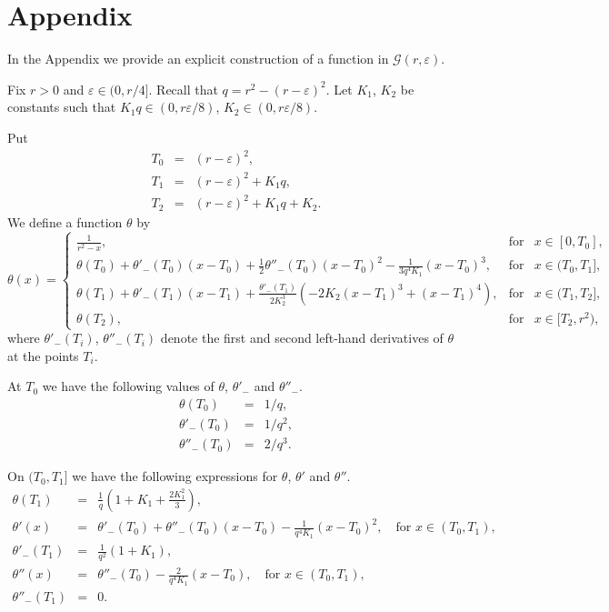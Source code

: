 \documentclass[a4paper,12pt,reqno]{amsart}
\theoremstyle{definition}
\theoremstyle{remark}
\newcommand{\eps}{\varepsilon}
\newcommand{\calG}{\mathcal{G}}
\begin{document}
 
\section{Appendix}
In the Appendix we provide an explicit construction of a function in $\calG(r,\eps)$.

Fix $r > 0$ and $\eps \in (0,r/4]$. Recall that $q = r^2 - (r- \eps)^2$. Let $K_1$, $K_2$ be constants such that $K_1 q \in (0,r\eps/8)$, 
$K_2 \in (0,r\eps/8)$.

Put 
\begin{eqnarray*}
T_0 &=& (r - \eps)^2,\\
T_1 &=& (r - \eps)^2 + K_1q,\\
T_2 &=& (r - \eps)^2 + K_1q + K_2.
\end{eqnarray*}
We define a function $\theta$ by
\begin{equation}
\label{construction_1}
\theta(x)= \left\{              
\begin{array}{lll}                   
\frac{1}{r^2 - x},&\text{for}& x \in [0,T_0], \\ 
\theta(T_0) + \theta'_{-}(T_0) (x-T_0) + \frac{1}{2}\theta''_{-}(T_0) (x-T_0)^2 - \frac{1}{3q^4 K_1} (x - T_0)^3,&\text{for}& x \in (T_0,T_1], \\ 
\theta(T_1) + \theta'_{-}(T_1) (x-T_1) + \frac{\theta'_{-}(T_1)}{2K_2^3}\left(-2K_2(x-T_1)^3+(x-T_1)^4\right),&\text{for}& x \in (T_1,T_2], \\ 
\theta(T_2),&\text{for}& x \in [T_2,r^2),
\end{array}       
\right. 
\end{equation}
where $\theta'_{-}(T_i)$, $\theta''_{-}(T_i)$ denote the first and second left-hand derivatives of $\theta$ at the points $T_i$. 

At $T_0$ we have the following values of $\theta$, $\theta'_{-}$ and $\theta''_{-}$.
\begin{eqnarray*}
\theta(T_0) &=& 1/q,\\
\theta'_{-}(T_0) &=& 1/q^2,\\
\theta''_{-}(T_0) &=& 2/q^3.
\end{eqnarray*}

On $(T_0,T_1]$ we have the following expressions for $\theta$, $\theta'$ and $\theta''$.
\begin{eqnarray*}
\theta(T_1) &=& \frac{1}{q} \left(1+K_1+\frac{2 K_1^2}{3}\right),\\
\theta'(x) &=& \theta'_{-}(T_0) + \theta''_{-}(T_0) (x-T_0) - \frac{1}{q^4 K_1} (x - T_0)^2,\quad \text{for $x \in (T_0,T_1)$,}\\
\theta'_{-}(T_1) &=& \frac{1}{q^2} \left(1+K_1\right),\\
\theta''(x) &=& \theta''_{-}(T_0) - \frac{2}{q^4 K_1} (x - T_0),\quad \text{for $x \in (T_0,T_1)$,}\\
\theta''_{-}(T_1) &=& 0.
\end{eqnarray*}
\end{document}
